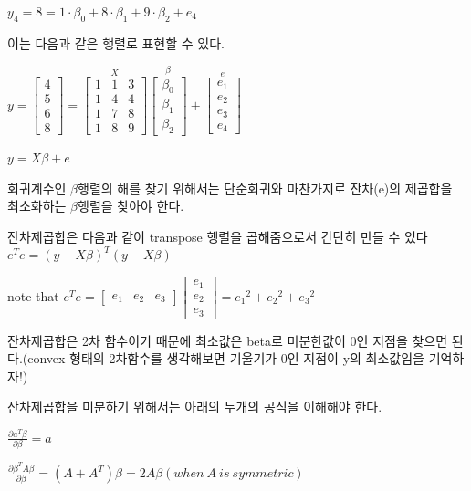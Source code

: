 \documentclass[
]{book}
\begin{document}
\(y_{4}=8=1\cdot \beta_{0}+8\cdot \beta_{1}+9\cdot \beta_{2}+e_{4}\)

이는 다음과 같은 행렬로 표현할 수 있다.

\(y=\begin{bmatrix}
4\\
5\\
6\\8
\end{bmatrix}=
\overset{X}{\begin{bmatrix}
1 & 1 & 3\\
1 &4  & 4\\
1 &7  & 8\\
1& 8 & 9
\end{bmatrix}}\overset{\beta}{\begin{bmatrix}
\beta_{0}\\
\beta_{1}\\
\beta_{2}
\end{bmatrix}}+\overset{e}{\begin{bmatrix}
e_{1}\\
e_{2}\\
e_{3}\\
e_{4}
\end{bmatrix}}\)

\(y=X\beta+e\)

회귀계수인 \(\beta\)행렬의 해를 찾기 위해서는 단순회귀와 마찬가지로 잔차(e)의 제곱합을 최소화하는 \(\beta\)행렬을 찾아야 한다.

잔차제곱합은 다음과 같이 transpose 행렬을 곱해줌으로서 간단히 만들 수 있다
\(e^Te=(y-X\beta)^T(y-X\beta)\)

note that
\(e^Te=\begin{bmatrix}
e_{1} & e_{2} & e_{3}
\end{bmatrix}\begin{bmatrix}
e_{1}\\
e_{2}\\
e_{3}
\end{bmatrix}={e_{1}}^2+{e_{2}}^2+{e_{3}}^2\)

잔차제곱합은 2차 함수이기 때문에 최소값은 beta로 미분한값이 0인 지점을 찾으면 된다.(convex 형태의 2차함수를 생각해보면 기울기가 0인 지점이 y의 최소값임을 기억하자!)

잔차제곱합을 미분하기 위해서는 아래의 두개의 공식을 이해해야 한다.

\(\frac{\partial a^T\beta}{\partial \beta}=a\)

\(\frac{\partial \beta^TA\beta}{\partial \beta}=(A+A^T)\beta=2A\beta (when\: A\: is\: symmetric)\)
\end{document}
